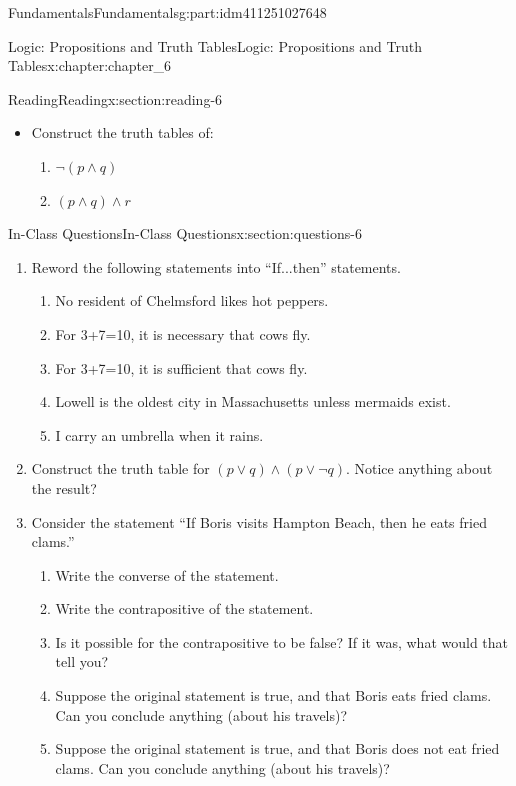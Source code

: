 \documentclass[oneside,10pt,]{book}
\numberwithin{equation}{section}
\begin{document}
\begin{partptx}{Fundamentals}{}{Fundamentals}{}{}{g:part:idm411251027648}
\begin{chapterptx}{Logic: Propositions and Truth Tables}{}{Logic: Propositions and Truth Tables}{}{}{x:chapter:chapter_6}
\begin{sectionptx}{Reading}{}{Reading}{}{}{x:section:reading-6}
\begin{itemize}[label=\textbullet]
%
\item{}Construct the truth tables of:%
\begin{multicols}{2}
\begin{enumerate}[label=(\alph*)]
\item{}\(\neg (p\land  q )\)%
\item{}\((p \land q)\land r\)%
\end{enumerate}
\end{multicols}
%
\end{itemize}
%
\end{sectionptx}
%
%
\typeout{************************************************}
\typeout{************************************************}
%
\begin{sectionptx}{In-Class Questions}{}{In-Class Questions}{}{}{x:section:questions-6}
%
\begin{enumerate}[label=\arabic*.]
\item{}Reword the following statements into ``If...then'' statements.%
\begin{enumerate}[label=(\alph*)]
\item{}No resident of Chelmsford likes hot peppers.%
\item{}For 3+7=10, it is necessary that cows fly.%
\item{}For 3+7=10, it is sufficient that cows fly.%
\item{}Lowell is the oldest city in Massachusetts unless mermaids exist.%
\item{}I carry an umbrella when it rains.%
\end{enumerate}
%
\item{}Construct the truth table for \((p \lor q) \land (p\lor \neg q)\).   Notice anything about the result?%
\item{}Consider the statement “If Boris visits Hampton Beach, then he eats fried clams.”%
\begin{enumerate}[label=(\alph*)]
\item{}Write the converse of the statement.%
\item{}Write the contrapositive of the statement.%
\item{}Is it possible for the contrapositive to be false? If it was, what would that tell you?%
\item{}Suppose the original statement is true, and that Boris eats fried clams. Can you conclude anything (about his travels)?%
\item{}Suppose the original statement is true, and that Boris does not eat fried clams. Can you conclude anything (about his travels)?%

\end{enumerate}
\end{enumerate}
\end{sectionptx}
\end{chapterptx}
\end{partptx}
\end{document}
